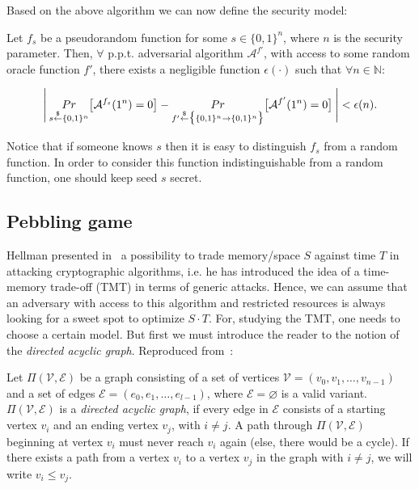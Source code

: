 \noindent Based on the above algorithm we can now define the security model:

\begin{definition}
  Let $f_{s}$ be a pseudorandom function for some $s \in \{0,1\}^{n}$, where $n$ is the security parameter. Then, $\forall$ p.p.t. adversarial algorithm $\mathcal{A}^{f'}$, with access to some random oracle function $f'$, there exists a negligible function $\epsilon(\cdot)$ such that $\forall n \in \mathbb{N}$:

  \begin{equation} \label{eq:secmodel}
    \Bigg{\lvert} \: \underset{s \overset{\$}{\gets} \{0,1\}^{n}}{Pr} \big{[} \mathcal{A}^{f_{s}}(1^{n}) = 0 \big{]} - \underset{f' \overset{\$}{\gets} \big{\{} \{0,1\}^{n}  \rightarrow \{0,1\}^{n} \big{\}}}{Pr} \big{[} \mathcal{A}^{f'}(1^{n}) = 0 \big{]} \: \Bigg{\rvert} < \epsilon(n).
  \end{equation}
\end{definition}

Notice that if someone knows $s$ then it is easy to distinguish $f_s$ from a random function. In order to consider this function indistinguishable from a random function, one should keep seed $s$ secret.

\subsection{Pebbling game}
Hellman presented in~\cite{Hellman:2006:CTT:2263346.2269686} a possibility to trade memory/space $S$ against time $T$ in attacking cryptographic algorithms, i.e. he has introduced the idea of a time-memory trade-off (TMT) in terms of generic attacks. Hence, we can assume that an adversary with access to this algorithm and restricted resources is always looking for a sweet spot to optimize $S \cdot T$. For, studying the TMT, one needs to choose a certain model. But first we must introduce the reader to the notion of the \emph{directed acyclic graph}. Reproduced from~\cite{ForlerLW13}:

\begin{definition}
  Let $\Pi(\mathcal{V},\mathcal{E})$ be a graph consisting of a set of vertices $\mathcal{V}=(v_0,v_1,\dots,v_{n-1})$ and a set of edges $\mathcal{E}=(e_0,e_1,\dots,e_{l-1})$, where $\mathcal{E}=\varnothing$ is a valid variant. $\Pi(\mathcal{V},\mathcal{E})$ is a \emph{directed acyclic graph}, if every edge in $\mathcal{E}$
  consists of a starting vertex $v_i$ and an ending vertex $v_j$, with $i \neq j$. A path through $\Pi(\mathcal{V},\mathcal{E})$ beginning at vertex $v_i$ must never reach $v_i$ again (else, there would be a cycle). If there exists a path from a vertex $v_i$ to a vertex $v_j$ in the graph with $i \neq j$, we will write $v_i \leq v_j$.
\end{definition}


